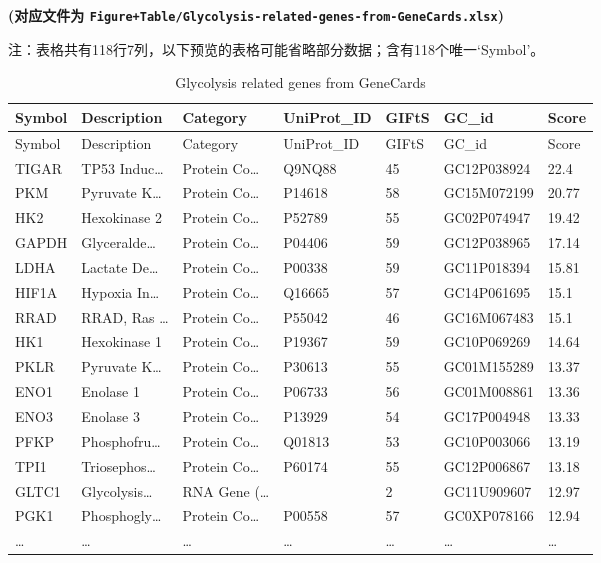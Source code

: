 \documentclass[
]{article}
\begin{document}
\textbf{(对应文件为 \texttt{Figure+Table/Glycolysis-related-genes-from-GeneCards.xlsx})}

\begin{center}\begin{tcolorbox}[colback=gray!10, colframe=gray!50, width=0.9\linewidth, arc=1mm, boxrule=0.5pt]注：表格共有118行7列，以下预览的表格可能省略部分数据；含有118个唯一`Symbol'。
\end{tcolorbox}
\end{center}

\begin{longtable}[]{@{}lllllll@{}}
\caption{\label{tab:Glycolysis-related-genes-from-GeneCards}Glycolysis related genes from GeneCards}\tabularnewline
\toprule
Symbol & Description & Category & UniProt\_ID & GIFtS & GC\_id & Score\tabularnewline
\midrule
\endfirsthead
\toprule
Symbol & Description & Category & UniProt\_ID & GIFtS & GC\_id & Score\tabularnewline
\midrule
\endhead
TIGAR & TP53 Induc\ldots{} & Protein Co\ldots{} & Q9NQ88 & 45 & GC12P038924 & 22.4\tabularnewline
PKM & Pyruvate K\ldots{} & Protein Co\ldots{} & P14618 & 58 & GC15M072199 & 20.77\tabularnewline
HK2 & Hexokinase 2 & Protein Co\ldots{} & P52789 & 55 & GC02P074947 & 19.42\tabularnewline
GAPDH & Glyceralde\ldots{} & Protein Co\ldots{} & P04406 & 59 & GC12P038965 & 17.14\tabularnewline
LDHA & Lactate De\ldots{} & Protein Co\ldots{} & P00338 & 59 & GC11P018394 & 15.81\tabularnewline
HIF1A & Hypoxia In\ldots{} & Protein Co\ldots{} & Q16665 & 57 & GC14P061695 & 15.1\tabularnewline
RRAD & RRAD, Ras \ldots{} & Protein Co\ldots{} & P55042 & 46 & GC16M067483 & 15.1\tabularnewline
HK1 & Hexokinase 1 & Protein Co\ldots{} & P19367 & 59 & GC10P069269 & 14.64\tabularnewline
PKLR & Pyruvate K\ldots{} & Protein Co\ldots{} & P30613 & 55 & GC01M155289 & 13.37\tabularnewline
ENO1 & Enolase 1 & Protein Co\ldots{} & P06733 & 56 & GC01M008861 & 13.36\tabularnewline
ENO3 & Enolase 3 & Protein Co\ldots{} & P13929 & 54 & GC17P004948 & 13.33\tabularnewline
PFKP & Phosphofru\ldots{} & Protein Co\ldots{} & Q01813 & 53 & GC10P003066 & 13.19\tabularnewline
TPI1 & Triosephos\ldots{} & Protein Co\ldots{} & P60174 & 55 & GC12P006867 & 13.18\tabularnewline
GLTC1 & Glycolysis\ldots{} & RNA Gene (\ldots{} & & 2 & GC11U909607 & 12.97\tabularnewline
PGK1 & Phosphogly\ldots{} & Protein Co\ldots{} & P00558 & 57 & GC0XP078166 & 12.94\tabularnewline
\ldots{} & \ldots{} & \ldots{} & \ldots{} & \ldots{} & \ldots{} & \ldots{}\tabularnewline
\bottomrule
\end{longtable}
\end{document}

